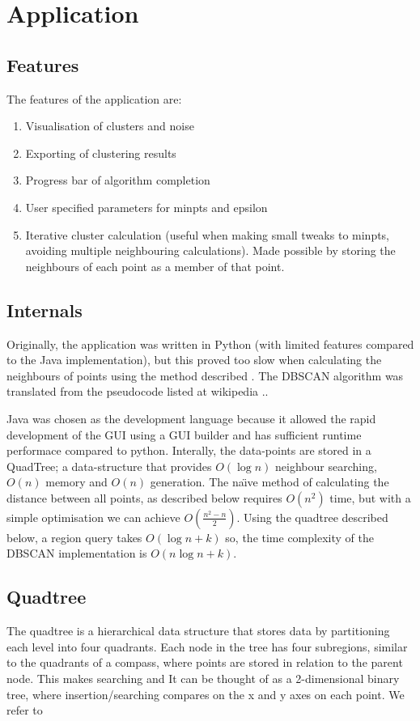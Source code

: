 \documentclass{CRPITStyle}
\renewcommand{\cite}{\citep}
\begin{document}
\section{Application}
\subsection{Features}
The features of the application are:
\begin{enumerate}
\item Visualisation of clusters and noise
\item Exporting of clustering results
\item Progress bar of algorithm completion
\item User specified parameters for minpts and epsilon
\item Iterative cluster calculation (useful when making small tweaks to minpts, avoiding multiple neighbouring calculations). Made possible by storing the neighbours of each point as a member of that point.
\end{enumerate}

\subsection{Internals}
Originally, the application was written in Python (with limited features compared to the Java implementation), but this proved too slow when calculating the neighbours of points using the method described . The DBSCAN algorithm was translated from the pseudocode listed at wikipedia \cite{wiki:dbscan}..

Java was chosen as the development language because it allowed the rapid development of the GUI using a GUI builder and has sufficient runtime performace compared to python. Interally, the data-points are stored in a QuadTree; a data-structure that provides $O(\log n)$ neighbour searching, $O(n)$ memory and $O(n)$ generation. The na\"{\i}ve method of calculating the distance between all points, as described below requires $O(n^2)$ time, but with a simple optimisation we can achieve $O(\frac{n^2 -n}{2})$.  Using the quadtree described below, a region query takes $O(\log n + k)$ so, the time complexity of the DBSCAN implementation is $O(n \log n + k)$.

\subsection{Quadtree}
The quadtree \cite{Samet:1984:QRH:356924.356930} is a hierarchical data structure that stores data by partitioning each level into four quadrants. Each node in the tree has four subregions, similar to the quadrants of a compass, where points are stored in relation to the parent node. This makes searching and  It can be thought of as a 2-dimensional binary tree, where insertion/searching compares on the x and y axes on each point. We refer to
\end{document}

